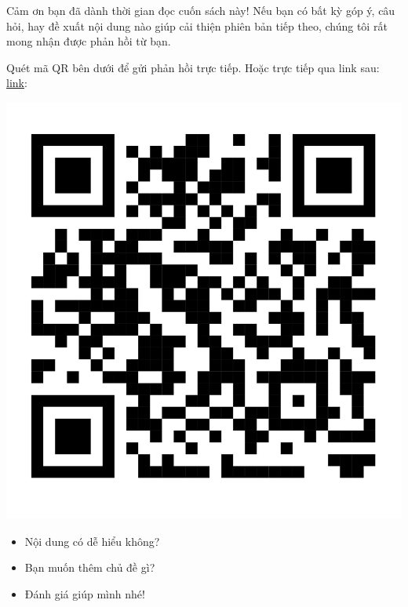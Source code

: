 Cảm ơn bạn đã dành thời gian đọc cuốn sách này! Nếu bạn có bất kỳ góp ý, câu hỏi, hay đề xuất nội dung nào giúp cải thiện phiên bản tiếp theo, chúng tôi rất mong nhận được phản hồi từ bạn.
\begin{center}
    
\begin{mynote} 
Quét mã QR bên dưới để gửi phản hồi trực tiếp. Hoặc trực tiếp qua link sau: \href{https://docs.google.com/forms/d/e/1FAIpQLSdcaJhbDg3Xu_x7aAFVxZJlK0dm-nBmFMbjgaEURXB1C8engw/viewform?usp=dialog}{link}: 

\includegraphics[width=0.8\linewidth]{Chap1-7/qrcode.pdf}

 \begin{itemize}[label=\small\rhombusdot]
 \item Nội dung có dễ hiểu không?
 \item Bạn muốn thêm chủ đề gì?
 \item Đánh giá giúp mình nhé!
 \end{itemize}
\end{mynote} 

\end{center}


